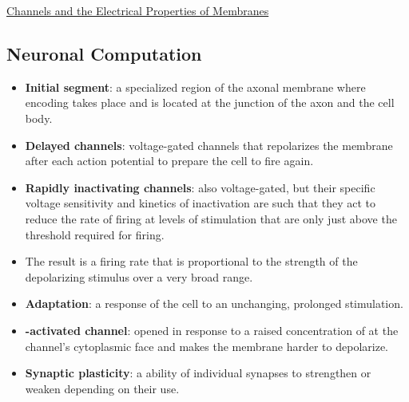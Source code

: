 \documentclass[12pt,letterpaper]{article}
\begin{document}
\begin{secbox}{\hyperlink{11}{Channels and the Electrical Properties of Membranes}}
{    \hypertarget{11.3.17}{\subsection*{Neuronal Computation}}
    \begin{itemize}
        \item \textbf{Initial segment}: a specialized region of the axonal membrane where encoding takes place and is located at the junction of the axon and the cell body.
        \item \textbf{Delayed  channels}: voltage-gated channels that repolarizes the membrane after each action potential to prepare the cell to fire again.
        \item \textbf{Rapidly inactivating  channels}: also voltage-gated, but their specific voltage sensitivity and kinetics of inactivation are such that they act to reduce the rate of firing at levels of stimulation that are only just above the threshold required for firing.
        \item The result is a firing rate that is proportional to the strength of the depolarizing stimulus over a very broad range.  
        \item \textbf{Adaptation}: a response of the cell to an unchanging, prolonged stimulation. 
        \item \textbf{-activated  channel}: opened in response to a raised concentration of  at the channel's cytoplasmic face and makes the membrane harder to depolarize.
        \item \textbf{Synaptic plasticity}: a ability of individual synapses to strengthen or weaken depending on their use. 
    \end{itemize}
    
}
\end{secbox}
\end{document}
